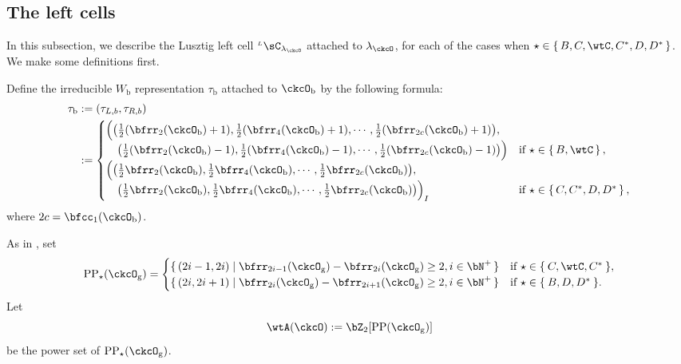\documentclass[12pt,a4paper]{amsart}
\numberwithin{equation}{section}
\theoremstyle{remark}
\def\half{{\tfrac{1}{2}}}
\def\LC{{}^{\scriptscriptstyle L}\sC}
\def\CPP{\mathrm{PP}}
\def\CPPs{\mathrm{PP}_{\star}}
\begin{document}
  \subsection{The left cells}
  \label{sec:LCBCD}
  In this subsection, we describe the Lusztig left cell $\LC_{\lambda_{\ckcO}}$
  attached to $\lambda_{\ckcO}$, for each of the cases when $\star \in \set{B,C,\wtC,C^{*},D,D^{*}}$. We make some definitions first.

  Define the irreducible $W_{\mathrm b}$ representation $\tau_{\mathrm b}$ attached to $\ckcO_{\mathrm b}$ by the following formula:
  \begin{equation}\label{eq:taub}
    \begin{split}
      \tau_{\mathrm b} & := (\tau_{L,b},\tau_{R,b})\\
      &:= \begin{cases}
        \Big(\big(\half(\bfrr_{2}(\ckcO_{\mathrm b})+1), \half(\bfrr_{4}(\ckcO_{\mathrm b})+1), \cdots, \half(\bfrr_{2c}(\ckcO_{\mathrm b})+1)\big),\\
        \hspace{1em}\big(\half(\bfrr_{2}(\ckcO_{\mathrm b})-1), \half(\bfrr_{4}(\ckcO_{\mathrm b})-1), \cdots, \half(\bfrr_{2c}(\ckcO_{\mathrm b})-1) \big)\Big)
        & \text{if } \star \in \set{B,\wtC},\\
        \Big( \big(\half\bfrr_{2}(\ckcO_{\mathrm b}), \half\bfrr_{4}(\ckcO_{\mathrm b}),\cdots, \half\bfrr_{2c}(\ckcO_{\mathrm b})\big), \\
        \hspace{1em} \big(\half\bfrr_{2}(\ckcO_{\mathrm b}), \half\bfrr_{4}(\ckcO_{\mathrm b}),\cdots, \half\bfrr_{2c}(\ckcO_{\mathrm b}) \big)\Big)_{I}
        & \text{if } \star \in \set{C,C^{*}, D,D^{*}},\\
      \end{cases}
    \end{split}
  \end{equation}
  where $2c = \bfcc_{1}(\ckcO_{\mathrm b})$.

  As in , set
  \[
    \CPPs(\ckcO_{\mathrm g}) =
    \begin{cases}
      \set{(2i-1,2i)| \bfrr_{2i-1}(\ckcO_{\mathrm g})- \bfrr_{2i}(\ckcO_{\mathrm g})\geq
        2, %
        i\in \bN^{+}} & \text{if $\star\in \Set{C,\wtC,C^{*}}$},\\
      \set{(2i,2i+1)| \bfrr_{2i}(\ckcO_{\mathrm g})- \bfrr_{2i+1}(\ckcO_{\mathrm g})\geq
        2, %
        i\in \bN^{+}} & \text{if $\star\in \Set{B,D,D^{*}}$}.
    \end{cases}
  \]
  Let
  \[
    \wtA(\ckcO) := \bZ_{2}[\CPP(\ckcO_{\mathrm g})]
  \] be the power set of $\CPPs(\ckcO_{\mathrm g})$.
\end{document}
